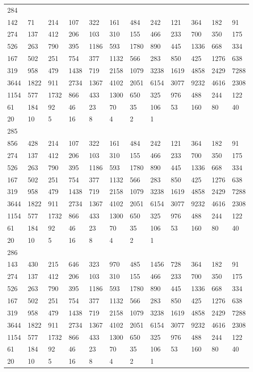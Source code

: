 \begin{longtable}{llllllllllll}
284&&&&&&&&&&&\\
142& 71& 214& 107& 322& 161& 484& 242& 121& 364& 182& 91\\
274& 137& 412& 206& 103& 310& 155& 466& 233& 700& 350& 175\\
526& 263& 790& 395& 1186& 593& 1780& 890& 445& 1336& 668& 334\\
167& 502& 251& 754& 377& 1132& 566& 283& 850& 425& 1276& 638\\
319& 958& 479& 1438& 719& 2158& 1079& 3238& 1619& 4858& 2429& 7288\\
3644& 1822& 911& 2734& 1367& 4102& 2051& 6154& 3077& 9232& 4616& 2308\\
1154& 577& 1732& 866& 433& 1300& 650& 325& 976& 488& 244& 122\\
61& 184& 92& 46& 23& 70& 35& 106& 53& 160& 80& 40\\
20& 10& 5& 16& 8& 4& 2& 1& \\

285&&&&&&&&&&&\\
856& 428& 214& 107& 322& 161& 484& 242& 121& 364& 182& 91\\
274& 137& 412& 206& 103& 310& 155& 466& 233& 700& 350& 175\\
526& 263& 790& 395& 1186& 593& 1780& 890& 445& 1336& 668& 334\\
167& 502& 251& 754& 377& 1132& 566& 283& 850& 425& 1276& 638\\
319& 958& 479& 1438& 719& 2158& 1079& 3238& 1619& 4858& 2429& 7288\\
3644& 1822& 911& 2734& 1367& 4102& 2051& 6154& 3077& 9232& 4616& 2308\\
1154& 577& 1732& 866& 433& 1300& 650& 325& 976& 488& 244& 122\\
61& 184& 92& 46& 23& 70& 35& 106& 53& 160& 80& 40\\
20& 10& 5& 16& 8& 4& 2& 1& \\

286&&&&&&&&&&&\\
143& 430& 215& 646& 323& 970& 485& 1456& 728& 364& 182& 91\\
274& 137& 412& 206& 103& 310& 155& 466& 233& 700& 350& 175\\
526& 263& 790& 395& 1186& 593& 1780& 890& 445& 1336& 668& 334\\
167& 502& 251& 754& 377& 1132& 566& 283& 850& 425& 1276& 638\\
319& 958& 479& 1438& 719& 2158& 1079& 3238& 1619& 4858& 2429& 7288\\
3644& 1822& 911& 2734& 1367& 4102& 2051& 6154& 3077& 9232& 4616& 2308\\
1154& 577& 1732& 866& 433& 1300& 650& 325& 976& 488& 244& 122\\
61& 184& 92& 46& 23& 70& 35& 106& 53& 160& 80& 40\\
20& 10& 5& 16& 8& 4& 2& 1& \\


\end{longtable}
